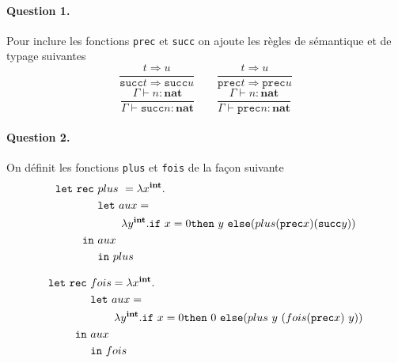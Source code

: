 \documentclass{article}
\title{\titre}
\date{}
\author{\auteur}
\newcommand{\titreCourt}{DM -- Mini-ML}
\newcommand{\auteur}{Marius \textsc{Dufraisse}}
\newcommand{\sem}{\Rightarrow}
\theoremstyle{thm}
\theoremstyle{def}
\theoremstyle{dem}
\newcommand{\code}[1]{\texttt{#1}}
\newcommand{\codem}[1]{\mathtt{#1}}
\newcommand{\types}[1]{\mathbf{#1}}
\begin{document}
	\renewcommand{\labelitemi}{\textbullet}



	\maketitle
	\paragraph{Question 1.}
	Pour inclure les fonctions \code{prec} et \code{succ} on ajoute les règles de sémantique et de typage suivantes
	\[ \frac{t \sem u}{\codem{succ}t\sem\codem{succ}{u}}\qquad \frac{t \sem u}{\codem{prec}t\sem\codem{prec}{u}} \]
	\[\frac{\Gamma\vdash  n : \types{nat}}{\Gamma\vdash \codem{succ}n:\types{nat}} \qquad\frac{\Gamma\vdash  n : \types{nat}}{\Gamma\vdash \codem{prec}n:\types{nat}}\]

	\paragraph{Question 2.}
	On définit les fonctions \code{plus} et \code{fois} de la façon suivante
	\begin{align*}
		\codem{let\ rec}\ &plus\ = \lambda x^{\types{int}} .\\
		&\codem{let}\ aux = \\
		&\hspace{0.75cm}\lambda y^{\types{int}}.\codem{if\ }x=0\codem{then}\ y\ \codem{else}(plus(\codem{prec}x)(\codem{succ}y))\\
		\codem{in}\ &aux\\
		&\codem{in\ }plus
	\end{align*}

	\begin{align*}
		\codem{let\ rec}\ &fois=\lambda x^{\types{int}} .\\
		&\codem{let}\ aux = \\
		&\hspace{0.75cm}\lambda y^{\types{int}}.\codem{if\ }x=0\codem{then}\ 0\ \codem{else}(plus\ y\ (fois(\codem{prec}x)\ y))\\
		\codem{in}\ &aux\\
		&\codem{in\ }fois
	\end{align*}
\end{document}
